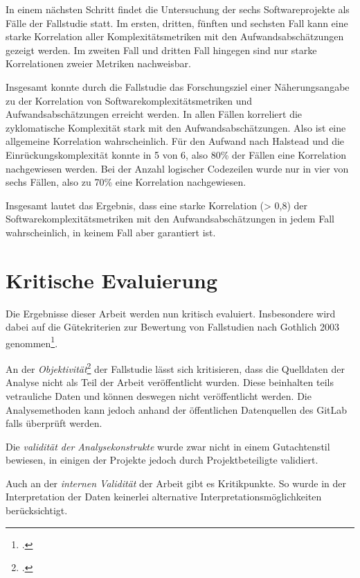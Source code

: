 In einem nächsten Schritt findet die Untersuchung der sechs
Softwareprojekte als Fälle der Fallstudie statt. Im ersten, dritten,
fünften und sechsten Fall kann eine starke Korrelation aller
Komplexitätsmetriken mit den Aufwandsabschätzungen gezeigt werden. Im
zweiten Fall und dritten Fall hingegen sind nur starke Korrelationen
zweier Metriken nachweisbar.

Insgesamt konnte durch die Fallstudie das Forschungsziel einer
Näherungsangabe zu der Korrelation von Softwarekomplexitätsmetriken und
Aufwandsabschätzungen erreicht werden. In allen Fällen korreliert die
zyklomatische Komplexität stark mit den Aufwandsabschätzungen. Also ist
eine allgemeine Korrelation wahrscheinlich. Für den Aufwand nach
Halstead und die Einrückungskomplexität konnte in 5 von 6, also 80\% der
Fällen eine Korrelation nachgewiesen werden. Bei der Anzahl logischer
Codezeilen wurde nur in vier von sechs Fällen, also zu 70\% eine
Korrelation nachgewiesen.

Insgesamt lautet das Ergebnis, dass eine starke Korrelation
(\textgreater{} 0,8) der Softwarekomplexitätsmetriken mit den
Aufwandsabschätzungen in jedem Fall wahrscheinlich, in keinem Fall aber
garantiert ist.

\section{Kritische Evaluierung}\label{kritische-evaluierung}

Die Ergebnisse dieser Arbeit werden nun kritisch evaluiert. Insbesondere
wird dabei auf die Gütekriterien zur Bewertung von Fallstudien nach
Gothlich 2003 genommen\footcite[Vgl. ][S. 13]{gothlichFallstudienAlsForschungsmethode2003}.

An der \emph{Objektivität}\footcite[Vgl. ][S. 13]{gothlichFallstudienAlsForschungsmethode2003} der Fallstudie lässt sich kritisieren, dass die Quelldaten der
Analyse nicht als Teil der Arbeit veröffentlicht wurden. Diese
beinhalten teils vetrauliche Daten und können deswegen nicht
veröffentlicht werden. Die Analysemethoden kann jedoch anhand der
öffentlichen Datenquellen des GitLab falls überprüft werden.

Die \emph{validität der Analysekonstrukte} wurde zwar nicht in einem
Gutachtenstil bewiesen, in einigen der Projekte jedoch durch
Projektbeteiligte validiert.

Auch an der \emph{internen Validität} der Arbeit gibt es Kritikpunkte.
So wurde in der Interpretation der Daten keinerlei alternative
Interpretationsmöglichkeiten berücksichtigt.

